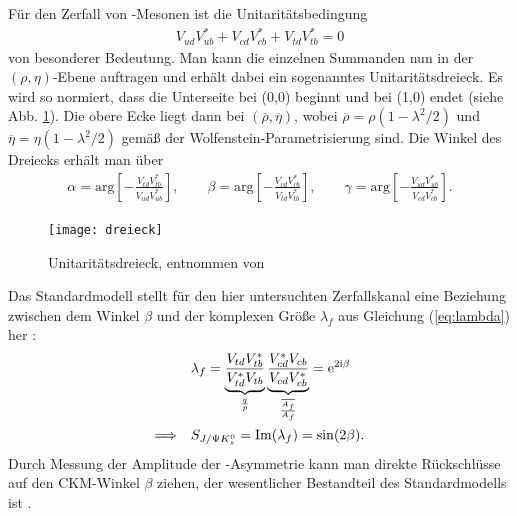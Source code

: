 Für den Zerfall von \Bd-Mesonen ist die Unitaritätsbedingung
\begin{align}
V_{ud}V_{ub}^* + V_{cd}V_{cb}^* + V_{td}V_{tb}^* = 0
\end{align}
von besonderer Bedeutung. Man kann die einzelnen Summanden nun in der $(\rho,\eta)$-Ebene auftragen und erhält dabei ein sogenanntes Unitaritätsdreieck. Es wird so normiert, dass die Unterseite bei (0,0) beginnt und bei (1,0) endet (siehe Abb. \ref{fig:unitarity}). Die obere Ecke liegt dann bei $(\overline{\rho}, \overline{\eta})$, wobei $\overline{\rho} = \rho(1-\lambda^2/2)$ und $\overline{\eta} = \eta(1-\lambda^2/2)$ gemäß der Wolfenstein-Parametrisierung sind. Die Winkel des Dreiecks erhält man über
\begin{align}
\alpha = \text{arg}\left[-\frac{V_{td}V_{tb}^*}{V_{ud}V_{ub}^*}\right], \qquad
\beta = \text{arg}\left[-\frac{V_{cd}V_{cb}^*}{V_{td}V_{tb}^*}\right], \qquad
\gamma = \text{arg}\left[-\frac{V_{ud}V_{ub}^*}{V_{cd}V_{cb}^*}\right].
\end{align}
\begin{figure}[hptb]
\centering
\texttt{[image: dreieck]}
\caption{Unitaritätsdreieck, entnommen von \cite{dreieck}}
\label{fig:unitarity}
\end{figure}
Das Standardmodell stellt für den hier untersuchten Zerfallskanal eine Beziehung zwischen dem Winkel $\beta$ und der komplexen Größe $\lambda_f$ aus Gleichung (\ref{eq:lambda}) her \cite{nir,noguchi}:
\begin{align}
&\lambda_f = \underbrace{\frac{V_{td}V_{tb}^*}{V_{td}^*V_{tb}}}_{\frac{q}{p}} \underbrace{\frac{V_{cd}^*V_{cb}}{V_{cd}V_{cb}^*}}_{\frac{\overline{A_f}}{A_f}} = \mathrm{e}^{2\mathrm{i}\beta} \\
\Longrightarrow \quad &S_{J/\Psi K_s^0} = \mathrm{Im}(\lambda_f) = \sin(2\beta).
\end{align}
Durch Messung der Amplitude der \CP-Asymmetrie kann man direkte Rückschlüsse auf den CKM-Winkel $\beta$ ziehen, der wesentlicher Bestandteil des Standardmodells ist \cite{nir}.